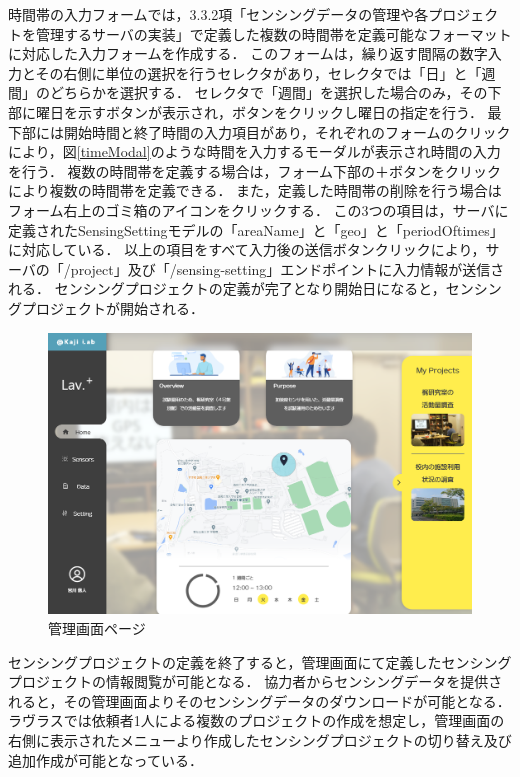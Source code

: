 時間帯の入力フォームでは，3.3.2項「センシングデータの管理や各プロジェクトを管理するサーバの実装」で定義した複数の時間帯を定義可能なフォーマットに対応した入力フォームを作成する．
このフォームは，繰り返す間隔の数字入力とその右側に単位の選択を行うセレクタがあり，セレクタでは「日」と「週間」のどちらかを選択する．
セレクタで「週間」を選択した場合のみ，その下部に曜日を示すボタンが表示され，ボタンをクリックし曜日の指定を行う．
最下部には開始時間と終了時間の入力項目があり，それぞれのフォームのクリックにより，図\ref{timeModal}のような時間を入力するモーダルが表示され時間の入力を行う．
複数の時間帯を定義する場合は，フォーム下部の＋ボタンをクリックにより複数の時間帯を定義できる．
また，定義した時間帯の削除を行う場合はフォーム右上のゴミ箱のアイコンをクリックする．
この3つの項目は，サーバに定義されたSensingSettingモデルの「areaName」と「geo」と「periodOftimes」に対応している．
以上の項目をすべて入力後の送信ボタンクリックにより，サーバの「/project」及び「/sensing-setting」エンドポイントに入力情報が送信される．
センシングプロジェクトの定義が完了となり開始日になると，センシングプロジェクトが開始される．

\begin{figure}[H]
  \centering
  \includegraphics[width= 150mm]{Dashboard.png}
  \caption{管理画面ページ}
  \label{server}
\end{figure}

センシングプロジェクトの定義を終了すると，管理画面にて定義したセンシングプロジェクトの情報閲覧が可能となる．
協力者からセンシングデータを提供されると，その管理画面よりそのセンシングデータのダウンロードが可能となる．
ラヴラスでは依頼者1人による複数のプロジェクトの作成を想定し，管理画面の右側に表示されたメニューより作成したセンシングプロジェクトの切り替え及び追加作成が可能となっている．

